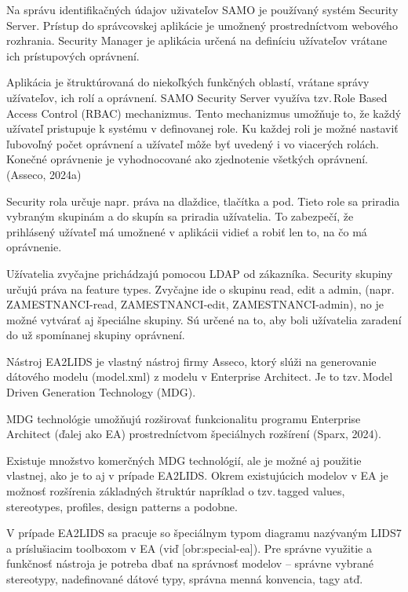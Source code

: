 Na správu identifikačných údajov uživateľov SAMO je používaný systém Security Server. Prístup do správcovskej aplikácie je umožnený prostredníctvom webového rozhrania. Security Manager je aplikácia určená na definíciu užívateľov vrátane ich prístupových oprávnení. 

Aplikácia je štruktúrovaná do niekoľkých funkčných oblastí, vrátane správy užívateľov, ich rolí a oprávnení. SAMO Security Server využíva tzv.\,Role Based Access Control (RBAC) mechanizmus. Tento mechanizmus umožňuje to, že každý užívateľ pristupuje k systému v definovanej role. Ku každej roli je možné nastaviť ľubovoľný počet oprávnení a užívateľ môže byť uvedený i vo viacerých rolách. Konečné oprávnenie je vyhodnocované ako zjednotenie všetkých oprávnení. \scr(Asseco, 2024a)

Security rola určuje napr. práva na dlaždice, tlačítka a pod. Tieto role sa priradia vybraným skupinám a do skupín sa priradia užívatelia. To zabezpečí, že prihlásený užívateľ má umožnené v aplikácii vidieť a robiť len to, na čo má oprávnenie.

Užívatelia zvyčajne prichádzajú pomocou LDAP od zákazníka. Security skupiny určujú práva na feature types. Zvyčajne ide o skupinu read, edit a admin, (napr. ZAMESTNANCI-read, ZAMESTNANCI-edit, ZAMESTNANCI-admin), no je možné vytvárať aj špeciálne skupiny. Sú určené na to, aby boli užívatelia zaradení do už spomínanej skupiny oprávnení.


Nástroj EA2LIDS je vlastný nástroj firmy Asseco, ktorý slúži na generovanie dátového modelu (model.xml) z modelu v Enterprise Architect. Je to tzv.\,Model Driven Generation Technology (MDG). 

MDG technológie umožňujú rozširovať funkcionalitu programu Enterprise Architect (ďalej ako EA) prostredníctvom špeciálnych rozšírení \scr(Sparx, 2024). 

Existuje množstvo komerčných MDG technológií, ale je možné aj použitie vlastnej, ako je to aj v prípade EA2LIDS. Okrem existujúcich modelov v EA je možnosť rozšírenia základných štruktúr napríklad o tzv.\,tagged values, stereotypes, profiles, design patterns a podobne. 

V prípade EA2LIDS sa pracuje so špeciálnym typom diagramu nazývaným LIDS7 a príslušiacim toolboxom v EA (viď [obr:special-ea]). Pre správne využitie a funkčnosť nástroja je potreba dbať na správnosť modelov -- správne vybrané stereotypy, nadefinované dátové typy, správna menná konvencia, tagy atď. 

